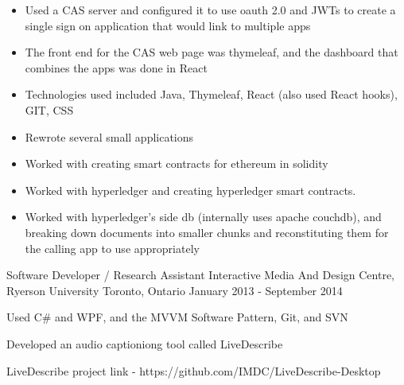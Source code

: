 \begin{cventries}
{\begin{cvitems}
{\begin{itemize}
                    \item {Used a CAS server and configured it to use oauth 2.0 and JWTs to create a single sign on application that would link to multiple apps}
                    \item {The front end for the CAS web page was thymeleaf, and the dashboard that combines the apps was done in React}
                \end{itemize}
            }
            \item[] {
                \begin{itemize}
                    \item {Technologies used included Java, Thymeleaf, React (also used React hooks), GIT, CSS}
                    \item {Rewrote several small applications}
                \end{itemize}
            }
            \item[] {
                \begin{itemize}
                    \item {Worked with creating smart contracts for ethereum in solidity}
                    \item {Worked with hyperledger and creating hyperledger smart contracts.}
                    \item {Worked with hyperledger's side db (internally uses apache couchdb),
                        and breaking down documents into smaller chunks and reconstituting them for the calling app to use appropriately}
                \end{itemize}
            }
        \end{cvitems}
    }

    \cventry
    {Software Developer / Research Assistant}
    {Interactive Media And Design Centre, Ryerson University}
    {Toronto, Ontario}
    {January 2013 - September 2014}
    {
        \begin{cvitems}
            \item {Used C\# and WPF, and the MVVM Software Pattern, Git, and SVN}
            \item {Developed an audio captioniong tool called LiveDescribe}
            \item {LiveDescribe project link - https://github.com/IMDC/LiveDescribe-Desktop}
        \end{cvitems}
    }
\end{cventries}